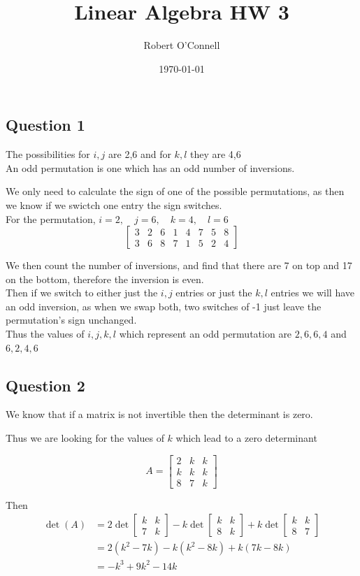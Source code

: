 \documentclass{article}
\title{\textbf{Linear Algebra HW 3}}
\author{Robert O'Connell}
\date{\today}
\begin{document}
\maketitle
\subsection*{Question 1}
The possibilities for \(i,j\) are 2,6 and for \(k,l\) they are 4,6
\\

An odd permutation is one which has an odd number of inversions. 

We only need to calculate the sign of one of the possible permutations, as then we know if we 
swictch one entry the sign switches.
\\

For the permutation, \(i = 2, \quad  j = 6, \quad k = 4, \quad l = 6\)
\[
\begin{bmatrix}
    3 & 2 & 6 & 1 & 4 & 7 & 5 & 8 \\
    3 & 6 & 8 & 7 & 1 & 5 & 2 & 4
\end{bmatrix}
\]

We then count the number of inversions, and find that there are 7 on top and 17 on the bottom, therefore the inversion is even.
\\

Then if we switch to either just the \(i,j\) entries or just the \(k,l\) entries we will have an odd inversion, as when we swap both, 
two switches of -1 just leave the permutation's sign unchanged.
\\

Thus the values of \(i,j,k,l\) which represent an odd permutation are 
\(2,6,6,4\) and \(6,2,4,6\)

\subsection*{Question 2}
We know that if a matrix is not invertible then the determinant is zero.

Thus we are looking for the values of \(k\) which lead to a zero determinant

\[
A = 
\begin{bmatrix}
    2 & k & k \\
    k & k & k \\
    8 & 7 & k
\end{bmatrix}
\]

Then 
\begin{align*}
    \det{(A)} &= 2 \det{\begin{bmatrix} k & k \\ 7 & k \end{bmatrix}} - k \det{\begin{bmatrix} k & k \\ 8 & k \end{bmatrix}} + k \det{\begin{bmatrix} k & k \\ 8 & 7 \end{bmatrix}} \\
    &= 2(k^2-7k) -k(k^2 -8k) + k(7k-8k) \\
    &= -k^3 + 9k^2 -14k
\end{align*}
\end{document}

